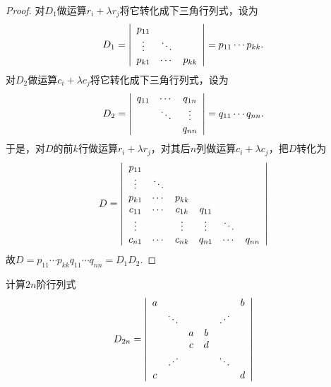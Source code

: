 \begin{proof}
  对$D_1$做运算$r_i+\lambda r_j$将它转化成下三角行列式，设为
  $$
  D_1 =  \left|
    \begin{array}{ccc}
      p_{11} &       & \\
      \vdots    & \ddots  &  \\
      p_{k1} & \cdots   & p_{kk} 
    \end{array}
  \right| = p_{11} \cdots p_{kk}.
  $$ 
  对$D_2$做运算$c_i+\lambda c_j$将它转化成下三角行列式，设为
  $$
  D_2 =  \left|
    \begin{array}{ccc}
      q_{11} & \cdots  &  q_{1n}\\
             & \ddots  &  \vdots \\
             &      & q_{nn} \\
    \end{array}
  \right| = q_{11}\cdots q_{nn}.
  $$  
  于是，对$D$的前$k$行做运算$r_i+\lambda r_j$，对其后$n$列做运算$c_i+\lambda c_j$，把$D$转化为
  $$
  D = \left|
    \begin{array}{cccccc}
      p_{11} &      &  &    &    &   \\
      \vdots    & \ddots    &   &    &    &   \\
      p_{k1} & \cdots & p_{kk} &    &    &   \\
      c_{11} & \cdots & c_{1k} & q_{11}&  &    \\
      \vdots    &     & \vdots   & \vdots  &  \ddots  &  \\
      c_{n1} & \cdots & c_{nk} & q_{n1}&  \cdots & q_{nn}
    \end{array}
  \right|
  $$  
  故$D = p_{11}\cdots p_{kk} q_{11}\cdots q_{nn} = D_1 D_2$.
\end{proof}

\begin{li}
  计算$2n$阶行列式
  $$
  D_{2n} = \left|
    \begin{array}{cccccc}
      a &     & & & & b \\
        & \ddots & & & \iddots & \\
        &   & a & b &  & \\
        &   & c & d &  &  \\
        & \iddots & & & \ddots & \\
      c &     & & & & d
    \end{array}
  \right|
  $$
\end{li}

